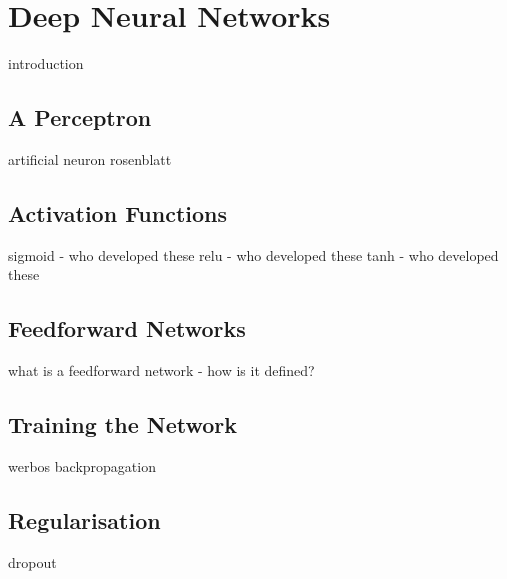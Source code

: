 \section{Deep Neural Networks}\label{dnn}
introduction


\subsection{A Perceptron}
artificial neuron rosenblatt

\subsection{Activation Functions}
sigmoid - who developed these
relu - who developed these
tanh - who developed these

\subsection{Feedforward Networks}
what is a feedforward network - how is it defined?

\subsection{Training the Network}
werbos backpropagation

\subsection{Regularisation}
dropout